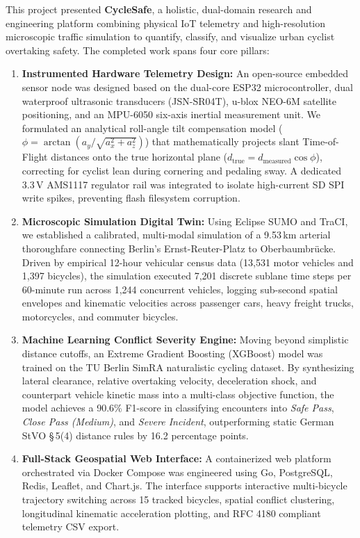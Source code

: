 This project presented \textbf{CycleSafe}, a holistic, dual-domain research and engineering platform combining physical IoT telemetry and high-resolution microscopic traffic simulation to quantify, classify, and visualize urban cyclist overtaking safety. The completed work spans four core pillars:
\begin{enumerate}
    \item \textbf{Instrumented Hardware Telemetry Design:} An open-source embedded sensor node was designed based on the dual-core ESP32 microcontroller, dual waterproof ultrasonic transducers (JSN-SR04T), u-blox NEO-6M satellite positioning, and an MPU-6050 six-axis inertial measurement unit. We formulated an analytical roll-angle tilt compensation model ($\phi = \arctan(a_y / \sqrt{a_x^2 + a_z^2})$) that mathematically projects slant Time-of-Flight distances onto the true horizontal plane ($d_{\text{true}} = d_{\text{measured}} \cos\phi$), correcting for cyclist lean during cornering and pedaling sway. A dedicated 3.3\,V AMS1117 regulator rail was integrated to isolate high-current SD SPI write spikes, preventing flash filesystem corruption.
    \item \textbf{Microscopic Simulation Digital Twin:} Using Eclipse SUMO and TraCI, we established a calibrated, multi-modal simulation of a 9.53\,km arterial thoroughfare connecting Berlin's Ernst-Reuter-Platz to Oberbaumbr{\"u}cke. Driven by empirical 12-hour vehicular census data (13,531 motor vehicles and 1,397 bicycles), the simulation executed 7,201 discrete sublane time steps per 60-minute run across 1,244 concurrent vehicles, logging sub-second spatial envelopes and kinematic velocities across passenger cars, heavy freight trucks, motorcycles, and commuter bicycles.
    \item \textbf{Machine Learning Conflict Severity Engine:} Moving beyond simplistic distance cutoffs, an Extreme Gradient Boosting (XGBoost) model was trained on the TU Berlin SimRA naturalistic cycling dataset. By synthesizing lateral clearance, relative overtaking velocity, deceleration shock, and counterpart vehicle kinetic mass into a multi-class objective function, the model achieves a 90.6\% F1-score in classifying encounters into \textit{Safe Pass}, \textit{Close Pass (Medium)}, and \textit{Severe Incident}, outperforming static German StVO \S\,5(4) distance rules by 16.2 percentage points.
    \item \textbf{Full-Stack Geospatial Web Interface:} A containerized web platform orchestrated via Docker Compose was engineered using Go, PostgreSQL, Redis, Leaflet, and Chart.js. The interface supports interactive multi-bicycle trajectory switching across 15 tracked bicycles, spatial conflict clustering, longitudinal kinematic acceleration plotting, and RFC 4180 compliant telemetry CSV export.
\end{enumerate}

